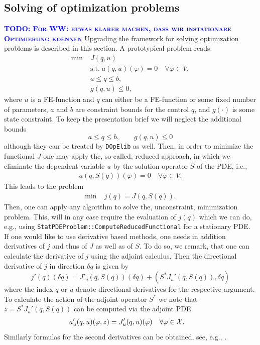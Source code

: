 \documentclass[smallextended]{svjour3}       %
\numberwithin{equation}{section}
\renewcommand{\phi}{\varphi}
\newcommand{\dope}{\texttt{DOpElib}}
\newcommand{\todo}[1]{\textbf{\textsc{\textcolor{blue}{TODO: #1}}}}
\begin{document}
\subsection{Solving of optimization problems}\label{sec:opt}
\todo{For WW: etwas klarer machen, dass wir instationare Optimierung koennen}
Upgrading the framework for solving optimization problems
is described in this section. A prototypical problem reads:
\begin{align*}
\min\;&J(q,u) \\
  &\text{s.t.}\; a(q,u)(\phi) = 0 \quad \forall \phi\in V,\\
  &a \le q \le b,\\
  &g(q,u) \le 0,  
\end{align*}
where $u$ is a FE-function and $q$ can either be a FE-function or some 
fixed number of parameters, $a$ and $b$ are constraint bounds for the control $q$,
and $g(\cdot)$ is some state constraint.
To keep the presentation brief we will neglect the additional bounds
\[
a \le q \le b,\qquad g(q,u) \le 0
\]
although they can be treated by \dope{} as well.
Then, in order to minimize the functional $J$ one may apply the, so-called, 
reduced approach, in which we eliminate the dependent variable $u$ by the solution 
operator $S$ of the PDE, i.e., 
\begin{align*}
a(q,S(q))(\phi) = 0 \quad \forall \phi\in V. 
\end{align*}
This leads to the problem
\begin{align*}
\min\;&j(q) = J(q,S(q)). 
\end{align*}
Then, one can apply any algorithm to solve the, unconstraint, minimization 
problem. This, will in any case require the evaluation of $j(q)$ which 
we can do, e.g., using \texttt{StatPDEProblem::ComputeReducedFunctional} for 
a stationary PDE. If one would like to use derivative based methods, one 
needs in addition derivatives of $j$ and thus of $J$ as well as of $S$. 
To do so, we remark, that one can calculate the derivative of 
$j$ using the adjoint calculus. Then the directional derivative 
of $j$ in direction $\delta q$ is given by
\[
j'(q)(\delta q) = J'_q(q,S(q))(\delta q) + (S^* J_u'(q,S(q)),\delta q)
\]
where the index $q$ or $u$ denote directional derivatives for the 
respective argument. To calculate the action of the adjoint operator $S^*$ 
we note that $z =  S^* J_u'(q,S(q))$
can be computed via the adjoint PDE
\begin{equation}
  \label{opt_KKT_system}
  \begin{aligned}
    a_{u}'(q,u)(\phi , z) &= J'_{u}(q,u)(\phi) & \forall \phi&\in {\cal X}.
  \end{aligned}
\end{equation}
Similarly formulas for the second derivatives can be obtained, see, e.g., 
\cite{BeMeVe06}.
\end{document}
